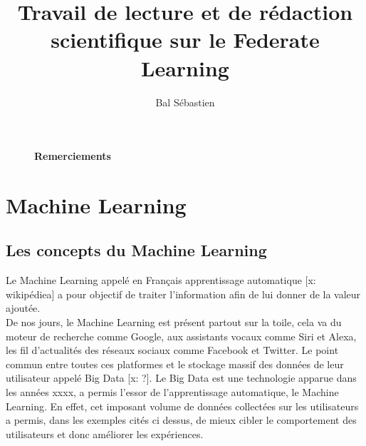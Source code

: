 \documentclass[12pt,a4paper]{report}
\begin{document}
\title{\Large{\Large {Travail de lecture et de rédaction scientifique sur le Federate Learning}}}

\author{Bal Sébastien}

\maketitle

\thispagestyle{empty} %

\fancyhead[LE,RO]{\leftmark}

\fancyhead[RE,LO]{}
\fancyfoot[RE,LO]{}
\fancyfoot[R]{\textbf{\thepage}}
 


\begin{figure}[p]

\large\textbf{Remerciements}


\end{figure}


 




\tableofcontents



\chapter{Machine Learning}
\thispagestyle{plain}\setcounter{page}{1} %
\section{Les concepts du Machine Learning}
Le Machine Learning appelé en Français apprentissage automatique [x: wikipédiea] a pour objectif de traiter l'information afin de lui donner de la valeur ajoutée.\\

De nos jours, le Machine Learning est présent partout sur la toile, cela va du moteur de recherche comme Google, aux assistants vocaux comme Siri et Alexa, les fil d'actualités des réseaux sociaux comme Facebook et Twitter. Le point commun entre toutes ces platformes et le stockage massif des données de leur utilisateur appelé Big Data [x: ?]. Le Big Data est une technologie apparue dans les années xxxx, a permis l'essor de l'apprentissage automatique, le Machine Learning. En effet, cet imposant volume de données collectées sur les utilisateurs a permis, dans les exemples cités ci dessus, de mieux cibler le comportement des utilisateurs et donc améliorer les expériences.\\
\end{document}
